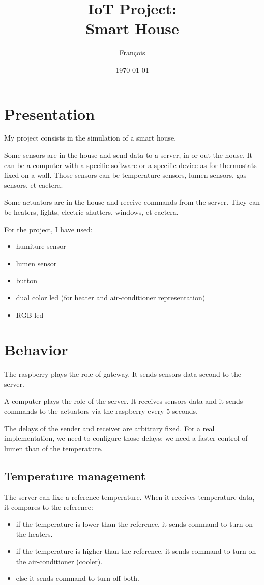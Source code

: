 \documentclass[10pt]{article}
\title{IoT Project:\\Smart House}
\author{Fran\c{c}ois \bsc{Bidet}}
\date{\today}
\begin{document}
\maketitle

\section{Presentation}

My project consists in the simulation of a smart house.

Some sensors are in the house and send data to a server, in or out the house. It can be a computer with a specific software or a specific device as for thermostats fixed on a wall. Those sensors can be temperature sensors, lumen sensors, gas sensors, et caetera.

Some actuators are in the house and receive commands from the server. They can be heaters, lights, electric shutters, windows, et caetera.

For the project, I have used:
\begin{itemize}
\item humiture sensor
\item lumen sensor
\item button
\item dual color led (for heater and air-conditioner representation)
\item RGB led
\end{itemize}

\section{Behavior}

The raspberry plays the role of gateway.
It sends sensors data second to the server.

A computer plays the role of the server. It receives sensors data and it sends commands to the actuators via the raspberry every 5 seconds.

The delays of the sender and receiver are arbitrary fixed. For a real implementation, we need to configure those delays: we need a faster control of lumen than of the temperature.

\subsection{Temperature management}

The server can fixe a reference temperature. When it receives temperature data, it compares to the reference:
\begin{itemize}
  \item if the temperature is lower than the reference, it sends command to turn on the heaters.
  \item if the temperature is higher than the reference, it sends command to turn on the air-conditioner (cooler).
  \item else it sends command to turn off both.
\end{itemize}
\end{document}
